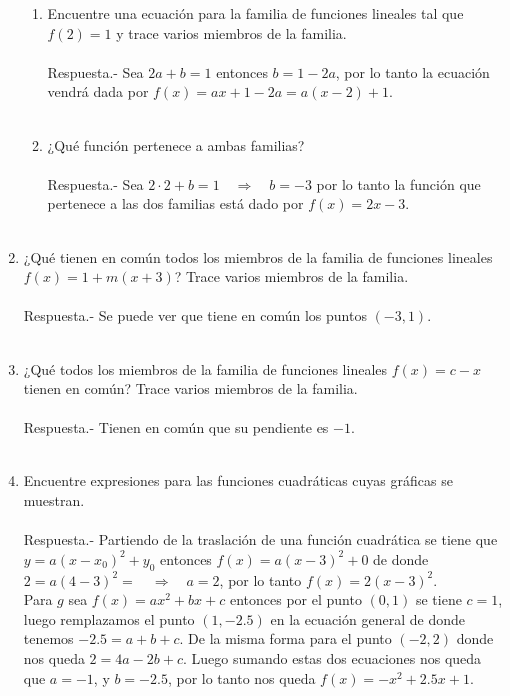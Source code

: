 \begin{enumerate}
\begin{enumerate}[\bfseries a)]
	\item Encuentre una ecuación para la familia de funciones  lineales tal que $f(2)=1$ y trace varios miembros de la familia.\\\\
	    Respuesta.-\; Sea $2a+b=1$ entonces $b=1-2a$, por lo tanto la ecuación vendrá dada por $f(x)=ax + 1 - 2a = a(x-2) + 1$.\\\\
	
	\item ¿Qué función pertenece a ambas familias?\\\\
	    Respuesta.-\; Sea $2\cdot 2+b=1 \quad \Rightarrow \quad b=-3$ por lo tanto la función que pertenece a las dos familias está dado por $f(x)=2x-3$.\\\\

    \end{enumerate}

    \item ¿Qué tienen en común todos los miembros de la familia de funciones lineales $f(x)=1+m(x+3)$? Trace varios miembros de la familia.\\\\
	Respuesta.-\; Se puede ver que tiene en común los puntos $(-3,1)$.\\\\

    \item ¿Qué todos los miembros de la familia de funciones lineales $f(x)=c-x$ tienen en común? Trace varios miembros de la familia.\\\\
	Respuesta.-\; Tienen en común que su pendiente es $-1$.\\\\

    \item Encuentre expresiones para las funciones cuadráticas cuyas gráficas se muestran.\\\\
	Respuesta.-\; Partiendo de la traslación de una función cuadrática se tiene que $y=a(x-x_0)^2 + y_0$ entonces $f(x)=a(x-3)^2 + 0$ de donde $2=a(4-3)^2 = \quad \Rightarrow \quad a=2$, por lo tanto $f(x)=2(x-3)^2$.\\
	Para $g$ sea $f(x)=ax^2 + bx +c$  entonces por el punto $(0,1)$ se tiene $c=1$, luego remplazamos el punto $(1,-2.5)$ en la ecuación general de donde tenemos $-2.5=a+b+c$. De la misma forma para el punto $(-2,2)$ donde nos queda $2=4a-2b+c$. Luego sumando estas dos ecuaciones nos queda que $a=-1$, y $b=-2.5$, por lo tanto nos queda $f(x)=-x^2 + 2.5x + 1$.\\\\


\end{enumerate}
